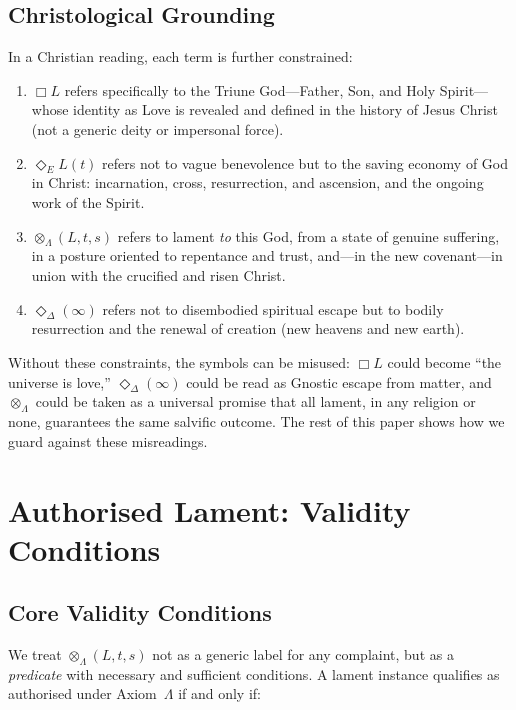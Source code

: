 \documentclass[11pt]{article}
\begin{document}
\subsection{Christological Grounding}

In a Christian reading, each term is further constrained:

\begin{enumerate}[label=(\alph*)]
  \item $\Box L$ refers specifically to the Triune God---Father, Son, and Holy Spirit---whose identity as Love is revealed and defined in the history of Jesus Christ (not a generic deity or impersonal force).
  \item $\Diamond_E L(t)$ refers not to vague benevolence but to the saving economy of God in Christ: incarnation, cross, resurrection, and ascension, and the ongoing work of the Spirit.
  \item $\otimes_{\Lambda}(L, t, s)$ refers to lament \emph{to} this God, from a state of genuine suffering, in a posture oriented to repentance and trust, and---in the new covenant---in union with the crucified and risen Christ.
  \item $\Diamond_{\Delta}(\infty)$ refers not to disembodied spiritual escape but to bodily resurrection and the renewal of creation (new heavens and new earth).
\end{enumerate}

Without these constraints, the symbols can be misused: $\Box L$ could become ``the universe is love,'' $\Diamond_{\Delta}(\infty)$ could be read as Gnostic escape from matter, and $\otimes_{\Lambda}$ could be taken as a universal promise that all lament, in any religion or none, guarantees the same salvific outcome. The rest of this paper shows how we guard against these misreadings.

\section{Authorised Lament: Validity Conditions}

\subsection{Core Validity Conditions}

We treat $\otimes_{\Lambda}(L, t, s)$ not as a generic label for any complaint, but as a \emph{predicate} with necessary and sufficient conditions. A lament instance qualifies as authorised under Axiom~$\Lambda$ if and only if:
\end{document}
